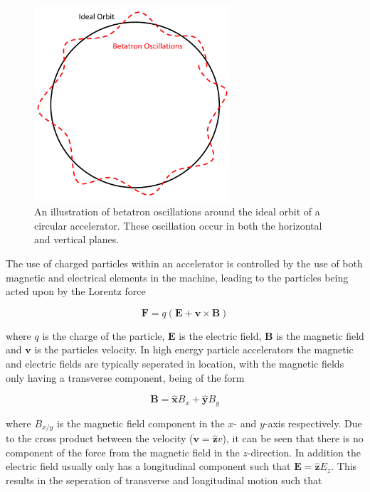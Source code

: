 \begin{figure}
\begin{center}
\includegraphics[width=0.65\textwidth]{Introduction/figures/betatron-motion.pdf}
\end{center}
\label{fig:betatron-motion}
\caption{An illustration of betatron oscillations around the ideal orbit of a circular accelerator. These oscillation occur in both the horizontal and vertical planes.}
\end{figure}

The use of charged particles within an accelerator is controlled by the use of both magnetic and electrical elements in the machine, leading to the particles being acted upon by the Lorentz force

\begin{equation}
\mathbf{F} = q \left( \mathbf{E} + \mathbf{v} \times \mathbf{B} \right)
\end{equation}

where $q$ is the charge of the particle, $\mathbf{E}$ is the electric field, $\mathbf{B}$ is the magnetic field and $\mathbf{v}$ is the particles velocity. In high energy particle accelerators the magnetic and electric fields are typically seperated in location, with the magnetic fields only having a transverse component, being of the form

\begin{equation}
\mathbf{B} = \mathbf{\hat{x}} B_{x} + \mathbf{\hat{y}} B_{y}
\end{equation}

where $B_{x/y}$ is the magnetic field component in the $x$- and $y$-axis respectively. Due to the cross product between the velocity ($\mathbf{v} = \mathbf{\hat{z}} v$), it can be seen that there is no component of the force from the magnetic field in the $z$-direction. In addition the electric field usually only has a longitudinal component such that $\mathbf{E} = \mathbf{\hat{z}} E_{z}$. This results in the seperation of transverse and longitudinal motion such that

